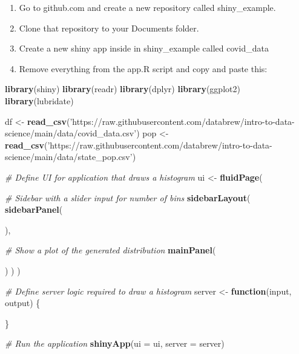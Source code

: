 \documentclass[
]{book}
\newenvironment{Shaded}{\begin{snugshade}}{\end{snugshade}}
\newcommand{\CommentTok}[1]{\textcolor[rgb]{0.56,0.35,0.01}{\textit{#1}}}
\newcommand{\ControlFlowTok}[1]{\textcolor[rgb]{0.13,0.29,0.53}{\textbf{#1}}}
\newcommand{\DataTypeTok}[1]{\textcolor[rgb]{0.13,0.29,0.53}{#1}}
\newcommand{\KeywordTok}[1]{\textcolor[rgb]{0.13,0.29,0.53}{\textbf{#1}}}
\newcommand{\NormalTok}[1]{#1}
\newcommand{\StringTok}[1]{\textcolor[rgb]{0.31,0.60,0.02}{#1}}
\begin{document}
\begin{enumerate}
\def\labelenumi{\arabic{enumi})}
\item
  Go to github.com and create a new repository called shiny\_example.
\item
  Clone that repository to your Documents folder.
\item
  Create a new shiny app inside in shiny\_example called covid\_data
\item
  Remove everything from the app.R script and copy and paste this:
\end{enumerate}

\begin{Shaded}
\begin{Highlighting}[]
\KeywordTok{library}\NormalTok{(shiny)}
\KeywordTok{library}\NormalTok{(readr)}
\KeywordTok{library}\NormalTok{(dplyr)}
\KeywordTok{library}\NormalTok{(ggplot2)}
\KeywordTok{library}\NormalTok{(lubridate)}


\NormalTok{df <-}\StringTok{ }\KeywordTok{read_csv}\NormalTok{(}\StringTok{'https://raw.githubusercontent.com/databrew/intro-to-data-science/main/data/covid_data.csv'}\NormalTok{)}
\NormalTok{pop <-}\StringTok{ }\KeywordTok{read_csv}\NormalTok{(}\StringTok{'https://raw.githubusercontent.com/databrew/intro-to-data-science/main/data/state_pop.csv'}\NormalTok{)}

\CommentTok{# Define UI for application that draws a histogram}
\NormalTok{ui <-}\StringTok{ }\KeywordTok{fluidPage}\NormalTok{(}

    \CommentTok{# Sidebar with a slider input for number of bins}
    \KeywordTok{sidebarLayout}\NormalTok{(}
        \KeywordTok{sidebarPanel}\NormalTok{(}

\NormalTok{        ),}

        \CommentTok{# Show a plot of the generated distribution}
        \KeywordTok{mainPanel}\NormalTok{(}

\NormalTok{        )}
\NormalTok{    )}
\NormalTok{)}

\CommentTok{# Define server logic required to draw a histogram}
\NormalTok{server <-}\StringTok{ }\ControlFlowTok{function}\NormalTok{(input, output) \{}


\NormalTok{\}}

\CommentTok{# Run the application}
\KeywordTok{shinyApp}\NormalTok{(}\DataTypeTok{ui =}\NormalTok{ ui, }\DataTypeTok{server =}\NormalTok{ server)}
\end{Highlighting}
\end{Shaded}
\end{document}
